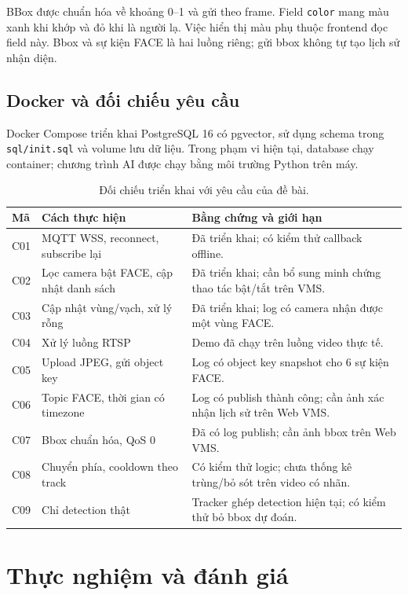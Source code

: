 \documentclass[11pt,a4paper]{article}
\begin{document}
BBox được chuẩn hóa về khoảng 0--1 và gửi theo frame. Field \texttt{color} mang màu xanh khi khớp và đỏ khi là người lạ. Việc hiển thị màu phụ thuộc frontend đọc field này. Bbox và sự kiện FACE là hai luồng riêng; gửi bbox không tự tạo lịch sử nhận diện.

\subsection{Docker và đối chiếu yêu cầu}
Docker Compose triển khai PostgreSQL 16 có pgvector, sử dụng schema trong \texttt{sql/init.sql} và volume lưu dữ liệu. Trong phạm vi hiện tại, database chạy container; chương trình AI được chạy bằng môi trường Python trên máy.

\begin{table}[ht]
\small
\begin{tabularx}{\linewidth}{@{}l Y Y@{}}
\toprule
Mã & Cách thực hiện & Bằng chứng và giới hạn\\
\midrule
C01 & MQTT WSS, reconnect, subscribe lại & Đã triển khai; có kiểm thử callback offline.\\
C02 & Lọc camera bật FACE, cập nhật danh sách & Đã triển khai; cần bổ sung minh chứng thao tác bật/tắt trên VMS.\\
C03 & Cập nhật vùng/vạch, xử lý rỗng & Đã triển khai; log có camera nhận được một vùng FACE.\\
C04 & Xử lý luồng RTSP & Demo đã chạy trên luồng video thực tế.\\
C05 & Upload JPEG, gửi object key & Log có object key snapshot cho 6 sự kiện FACE.\\
C06 & Topic FACE, thời gian có timezone & Log có publish thành công; cần ảnh xác nhận lịch sử trên Web VMS.\\
C07 & Bbox chuẩn hóa, QoS 0 & Đã có log publish; cần ảnh bbox trên Web VMS.\\
C08 & Chuyển phía, cooldown theo track & Có kiểm thử logic; chưa thống kê trùng/bỏ sót trên video có nhãn.\\
C09 & Chỉ detection thật & Tracker ghép detection hiện tại; có kiểm thử bỏ bbox dự đoán.\\
\bottomrule
\end{tabularx}
\caption{Đối chiếu triển khai với yêu cầu của đề bài.}
\end{table}

\section{Thực nghiệm và đánh giá}
\end{document}
